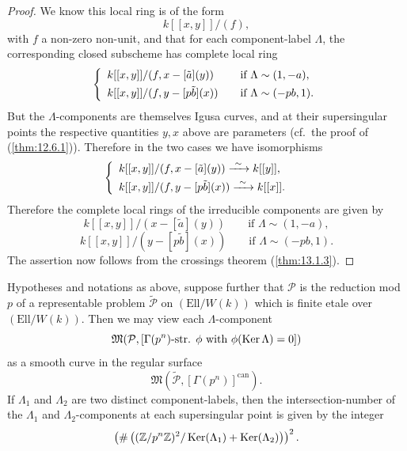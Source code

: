 \begin{proof}
We know this local ring is of the form
\[
k[[x,y]]/(f) ,
\]
with $f$ a non-zero non-unit, and that for each component-label $\Lambda$, the corresponding closed subscheme has complete local ring
\[
\left\{\begin{array}{l@{\qquad}l}
k[[x,y]]/(f, x - [\tilde a](y)) & \text{if } \Lambda \sim (1, -a) , \\[4pt]
k[[x,y]]/(f, y - [p\tilde b](x)) & \text{if } \Lambda \sim (-pb, 1) .
\end{array}\right.
\]
But the $\Lambda$-components are themselves Igusa curves, and at their supersingular points the respective quantities $y, x$ above are parameters (cf.\ the proof of (\ref{thm:12.6.1})). Therefore in the two cases we have isomorphisms
\[
\left\{\begin{array}{l@{\qquad}l}
k[[x,y]]/(f, x - [\tilde a](y)) \xrightarrow{\ \sim\ } k[[y]] , \\[4pt]
k[[x,y]]/(f, y - [p\tilde b](x)) \xrightarrow{\ \sim\ } k[[x]] .
\end{array}\right.
\]
Therefore the complete local rings of the irreducible components are given by
\[
k[[x,y]]/(x - [\tilde a](y)) \qquad \text{if } \Lambda \sim (1, -a) ,
\]
\[
k[[x,y]]/(y - [p\tilde b](x)) \qquad \text{if } \Lambda \sim (-pb, 1) .
\]
The assertion now follows from the crossings theorem (\ref{thm:13.1.3}).
\end{proof}

\begin{kcor}\label{cor:13.8.5}
Hypotheses and notations as above, suppose further that $\mathcal{P}$ is the reduction mod $p$ of a representable problem $\widetilde{\mathcal{P}}$ on $(\mathrm{Ell}/W(k))$ which is finite etale over $(\mathrm{Ell}/W(k))$. Then we may view each $\Lambda$-component
\[
\mathfrak{M}(\mathcal{P}, [\Gamma(p^n)\text{-str. } \phi \text{ with } \phi(\operatorname{Ker} \Lambda) = 0])
\]
as a smooth curve in the regular surface
\[
\mathfrak{M}(\widetilde{\mathcal{P}}, [\Gamma(p^n)]^{\mathrm{can}}) .
\]
If $\Lambda_1$ and $\Lambda_2$ are two distinct component-labels, then the intersection-number of the $\Lambda_1$ and $\Lambda_2$-components at each supersingular point is given by the integer
\[
\left(\#\left((\mathbb{Z}/p^n\mathbb{Z})^2/\operatorname{Ker}(\Lambda_1)+\operatorname{Ker}(\Lambda_2)\right)\right)^2 .
\]
\end{kcor}


